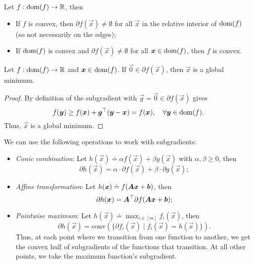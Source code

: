 \begin{lemma}
    Let $f: \mathrm{dom}(f) \to \mathbb{R}$, then
    \begin{itemize}
        \item If $f$ is convex, then $\partial f(\vec{x}) \neq \emptyset$ for all $\vec{x}$ in the relative
              interior of $\mathrm{dom}(f)$ (so not necessarily on the edges);
        \item If $\mathrm{dom}(f)$ is convex and $\partial f(\vec{x}) \neq \emptyset$ for all $\bm{x} \in \mathrm{dom}(f)$, then
              $f$ is convex.
    \end{itemize}
\end{lemma}

\begin{lemma}
    Let $f: \mathrm{dom}(f) \to \mathbb{R}$ and $\bm{x} \in \mathrm{dom}(f)$. If $\vec{0} \in \partial f(\vec{x})$, then $\vec{x}$ is a global minimum.
\end{lemma}

\begin{proof}
    By definition of the subgradient with $\vec{g} = \vec{0} \in \partial f(\vec{x})$ gives \[
        f(\bm{y}) \geq f(\bm{x}) + \bm{g}^\top (\bm{y} - \bm{x}) = f(\bm{x}), \quad \forall \bm{y} \in \mathrm{dom}(f).
    \]
    Thus, $\vec{x}$ is a global minimum.
\end{proof}

\begin{lemma}
    We can use the following operations to work with subgradients:
    \begin{itemize}
        \item \textit{Conic combination}: Let $h(\vec{x}) \doteq \alpha f(\vec{x}) + \beta g(\vec{x})$ with $\alpha,\beta \geq
                  0$, then \[
                  \partial h(\vec{x}) = \alpha \cdot \partial f(\vec{x}) + \beta \cdot \partial g(\vec{x});
              \]
        \item \textit{Affine transformation}: Let $h(\bm{x}) \doteq f(\bm{A} \bm{x} + \bm{b})$, then \[
                  \partial h(\bm{x}) = \bm{A}^\top \partial f(\bm{A} \bm{x} + \bm{b});
              \]
        \item \textit{Pointwise maximum}: Let $h(\vec{x}) \doteq \max_{i\in [m]} f_i(\vec{x})$, then \[
                  \partial h(\vec{x}) = \mathrm{conv}(\{ \partial f_i(\vec{x}) \mid f_i(\vec{x}) = h(\vec{x}) \}).
              \]
              Thus, at each point where we transition from one function to another, we get the convex hull of
              subgradients of the functions that transition. At all other points, we take the maximum function's
              subgradient.
    \end{itemize}
\end{lemma}

